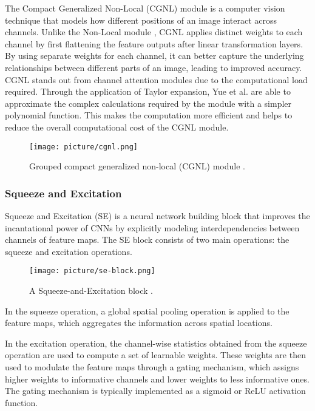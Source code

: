 \documentclass{article}
\begin{document}
The Compact Generalized Non-Local (CGNL) \cite{cgnl} module is a computer vision technique that models how different positions of an image interact across channels. Unlike the Non-Local module \cite{nonlocal}, CGNL applies distinct weights to each channel by first flattening the feature outputs after linear transformation layers. By using separate weights for each channel, it can better capture the underlying relationships between different parts of an image, leading to improved accuracy. CGNL stands out from channel attention modules due to the computational load required. Through the application of Taylor expansion, Yue et al. \cite{cgnl} are able to approximate the complex calculations required by the module with a simpler polynomial function. This makes the computation more efficient and helps to reduce the overall computational cost of the CGNL module.

\begin{figure*}[ht!]
\centering
\texttt{[image: picture/cgnl.png]} 
\caption{Grouped compact generalized non-local (CGNL) module \cite{cgnl}.}
\label{fig:CGNL}
\end{figure*}

\subsubsection{Squeeze and Excitation}

Squeeze and Excitation (SE) \cite{SE} is a neural network building block that improves the incantational power of CNNs by explicitly modeling interdependencies between channels of feature maps. 
The SE block consists of two main operations: the squeeze and excitation operations. 


\begin{figure*}[ht!]
\centering
\texttt{[image: picture/se-block.png]} 
\caption{A Squeeze-and-Excitation block \cite{SE}.}
\label{fig:SE}
\end{figure*}

In the squeeze operation, a global spatial pooling operation is applied to the feature maps, which aggregates the information across spatial locations.

In the excitation operation, the channel-wise statistics obtained from the squeeze operation are used to compute a set of learnable weights. These weights are then used to modulate the feature maps through a gating mechanism, which assigns higher weights to informative channels and lower weights to less informative ones. The gating mechanism is typically implemented as a sigmoid or ReLU activation function.
\end{document}
